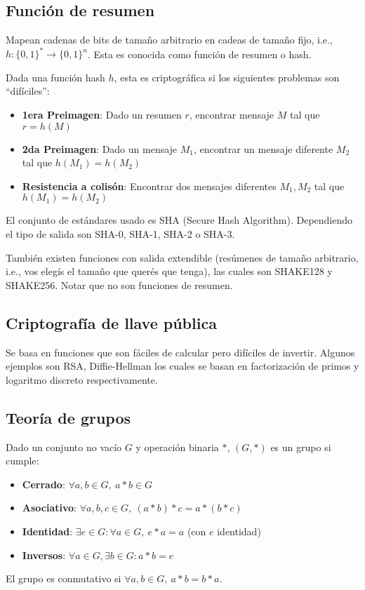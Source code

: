   \subsection{Función de resumen}
  Mapean cadenas de bits de tamaño arbitrario en cadeas de tamaño fijo, i.e., $h : \{0,1\}^* \to \{0,1\}^n$.
  Esta es conocida como función de resumen o hash.
  \begin{definition}
    Dada una función hash $h$, esta es criptográfica si los siguientes problemas son ``difíciles'':
    \begin{itemize}
      \item \textbf{1era Preimagen}: Dado un resumen $r$, encontrar mensaje $M$ tal que $r = h(M)$
      \item \textbf{2da Preimagen}: Dado un mensaje $M_1$, encontrar un mensaje diferente $M_2$ tal que $h(M_1) = h(M_2)$
      \item \textbf{Resistencia a colisón}: Encontrar dos mensajes diferentes $M_1, M_2$ tal que $h(M_1) = h(M_2)$
    \end{itemize}
  \end{definition}
  \begin{remark}
    El conjunto de estándares usado es SHA (Secure Hash Algorithm).
    Dependiendo el tipo de salida son SHA-0, SHA-1, SHA-2 o SHA-3.
  \end{remark}
  También existen funciones con salida extendible (resúmenes de tamaño
  arbitrario, i.e., vos elegís el tamaño que querés que tenga), las 
  cuales son SHAKE128 y SHAKE256.
  Notar que no son funciones de resumen.

  \subsection{Criptografía de llave pública}
  Se basa en funciones que son fáciles de calcular pero difíciles de invertir.
  Algunos ejemplos son RSA, Diffie-Hellman los cuales se basan en factorización de primos 
  y logaritmo discreto respectivamente.

  \subsection{Teoría de grupos}
  \begin{definition}[Grupo]
    Dado un conjunto no vacío $G$ y operación binaria $*$, $(G, *)$ es un grupo si cumple:
    \begin{itemize}
      \item \textbf{Cerrado}: $\forall a,b\in G,\ a*b \in G$
      \item \textbf{Asociativo}: $\forall a,b,c\in G,\ (a*b)*c = a*(b*c)$
      \item \textbf{Identidad}: $\exists e\in G : \forall a\in G,\ e*a = a$ (con $e$ identidad)
      \item \textbf{Inversos}: $\forall a\in G, \exists b\in G : a*b=e$
    \end{itemize}
    El grupo es conmutativo si $\forall a,b\in G,\ a*b=b*a$.
  \end{definition}

